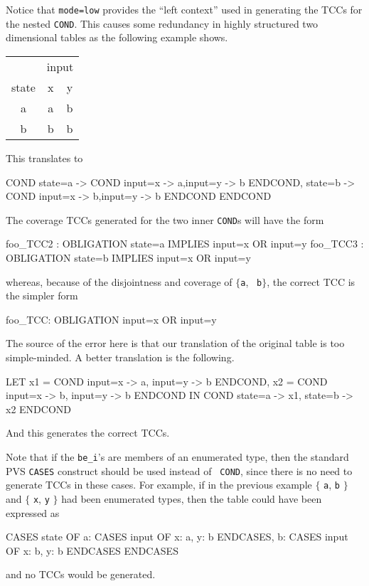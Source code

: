 Notice that {\tt mode=low} provides the ``left context'' used in
generating the TCCs for the nested {\tt COND}.  This causes some
redundancy in highly structured two dimensional tables as the
following example shows.
\begin{center}
\begin{tabular}{|c||c|c|}
\hline
 & \multicolumn{2}{c|}{input}\\
\cline{2-3}
state & x & y\\
\hline
\hline
a & a & b\\
\hline
b & b & b\\
\hline
\end{tabular}
\end{center}
This translates to
\begin{pvsex}
  COND
    state=a -> COND input=x -> a,input=y -> b ENDCOND,
    state=b -> COND input=x -> b,input=y -> b ENDCOND
  ENDCOND
\end{pvsex}
The coverage TCCs generated for the two inner {\tt COND}s will have the form
\begin{pvsex}
   foo\_TCC2 : OBLIGATION state=a IMPLIES input=x OR input=y
   foo\_TCC3 : OBLIGATION state=b IMPLIES input=x OR input=y
\end{pvsex}
whereas, because of the disjointness and coverage of $\{${\tt a}, {\tt
b}$\}$, the correct TCC is the simpler form
\begin{pvsex}
   foo\_TCC: OBLIGATION input=x OR input=y
\end{pvsex}
The source of the error here is that our translation of the original
table is too simple-minded.  A better translation is the following.
\begin{pvsex}
  LET
    x1 = COND input=x -> a, input=y -> b ENDCOND,
    x2 = COND input=x -> b, input=y -> b ENDCOND
  IN
    COND state=a -> x1, state=b -> x2 ENDCOND
\end{pvsex}
And this generates the correct TCCs.

Note that if the {\tt be\_i}'s are members of an enumerated type, then
the standard PVS {\tt CASES} construct should be used instead of {\tt
COND}, since there is no need to generate TCCs in these cases.  For
example, if in the previous example $\{$ {\tt a}, {\tt b} $\}$ and
$\{$ {\tt x}, {\tt y} $\}$ had been enumerated types, then the table
could have been expressed as
\begin{pvsex}
  CASES state OF
    a: CASES input OF x: a, y: b ENDCASES,
    b: CASES input OF x: b, y: b ENDCASES
  ENDCASES
\end{pvsex}
and no TCCs would be generated.

